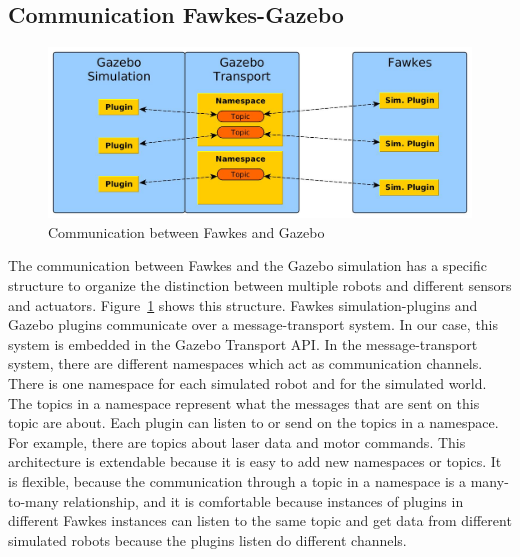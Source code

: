 \subsection{Communication Fawkes-Gazebo}
\label{sec:architecture_communication}
\begin{figure}
\center
\includegraphics[width=\textwidth]{tabs/communication}
\caption{Communication between Fawkes and Gazebo}
\label{fig:communication}
\end{figure}
The communication between Fawkes and the Gazebo simulation has a specific structure to organize the distinction between multiple robots and different sensors and actuators. Figure~\ref{fig:communication} shows this structure. Fawkes simulation-plugins and Gazebo plugins communicate over a message-transport system. In our case, this system is embedded in the Gazebo Transport API. In the message-transport system, there are different namespaces which act as communication channels. There is one namespace for each simulated robot and for the simulated world. The topics in a namespace represent what the messages that are sent on this topic are about. Each plugin can listen to or send on the topics in a namespace. For example, there are topics about laser data and motor commands. This architecture is extendable because it is easy to add new namespaces or topics. It is flexible, because the communication through a topic in a namespace is a many-to-many relationship, and it is comfortable because instances of plugins in different Fawkes instances can listen to the same topic and get data from different simulated robots because the plugins listen do different channels.


